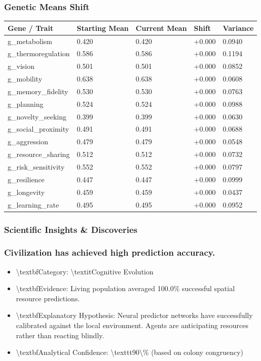 \documentclass[11pt,a4paper]{article}
\begin{document}
\subsubsection*{ Genetic Means Shift}
\begin{longtable}{lllll}
\toprule
Gene / Trait & Starting Mean & Current Mean & Shift & Variance \\
\midrule
\endhead
g\_metabolism & 0.420 & 0.420 & +0.000 & 0.0940 \\
g\_thermoregulation & 0.586 & 0.586 & +0.000 & 0.1194 \\
g\_vision & 0.501 & 0.501 & +0.000 & 0.0852 \\
g\_mobility & 0.638 & 0.638 & +0.000 & 0.0608 \\
g\_memory\_fidelity & 0.530 & 0.530 & +0.000 & 0.0763 \\
g\_planning & 0.524 & 0.524 & +0.000 & 0.0988 \\
g\_novelty\_seeking & 0.399 & 0.399 & +0.000 & 0.0630 \\
g\_social\_proximity & 0.491 & 0.491 & +0.000 & 0.0688 \\
g\_aggression & 0.479 & 0.479 & +0.000 & 0.0548 \\
g\_resource\_sharing & 0.512 & 0.512 & +0.000 & 0.0732 \\
g\_risk\_sensitivity & 0.552 & 0.552 & +0.000 & 0.0797 \\
g\_resilience & 0.447 & 0.447 & +0.000 & 0.0999 \\
g\_longevity & 0.459 & 0.459 & +0.000 & 0.0437 \\
g\_learning\_rate & 0.495 & 0.495 & +0.000 & 0.0952 \\
\bottomrule
\end{longtable}

\subsubsection*{ Scientific Insights \& Discoveries}
\subsubsection*{ Civilization has achieved high prediction accuracy.}
\begin{itemize}
  \item \textbackslash{}textbf{Category:} \textbackslash{}textit{Cognitive Evolution}
  \item \textbackslash{}textbf{Evidence:} Living population averaged 100.0\% successful spatial resource predictions.
  \item \textbackslash{}textbf{Explanatory Hypothesis:} Neural predictor networks have successfully calibrated against the local environment. Agents are anticipating resources rather than reacting blindly.
  \item \textbackslash{}textbf{Analytical Confidence:} \textbackslash{}texttt{90\textbackslash{}\%} (based on colony congruency)
\end{itemize}
\end{document}
